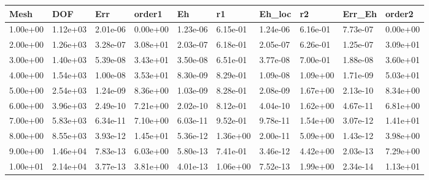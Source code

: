 \begin{tabular}{llllllllll}
Mesh & DOF & Err & order1 & Eh & r1 & Eh_loc & r2 & Err_Eh & order2 \\ 
\hline 
1.00e+00 & 1.12e+03 & 2.01e-06 & 0.00e+00 & 1.23e-06 & 6.15e-01 & 1.24e-06 & 6.16e-01 & 7.73e-07 & 0.00e+00 \\ 
2.00e+00 & 1.26e+03 & 3.28e-07 & 3.08e+01 & 2.03e-07 & 6.18e-01 & 2.05e-07 & 6.26e-01 & 1.25e-07 & 3.09e+01 \\ 
3.00e+00 & 1.40e+03 & 5.39e-08 & 3.43e+01 & 3.50e-08 & 6.51e-01 & 3.77e-08 & 7.00e-01 & 1.88e-08 & 3.60e+01 \\ 
4.00e+00 & 1.54e+03 & 1.00e-08 & 3.53e+01 & 8.30e-09 & 8.29e-01 & 1.09e-08 & 1.09e+00 & 1.71e-09 & 5.03e+01 \\ 
5.00e+00 & 2.54e+03 & 1.24e-09 & 8.36e+00 & 1.03e-09 & 8.28e-01 & 2.08e-09 & 1.67e+00 & 2.13e-10 & 8.34e+00 \\ 
6.00e+00 & 3.96e+03 & 2.49e-10 & 7.21e+00 & 2.02e-10 & 8.12e-01 & 4.04e-10 & 1.62e+00 & 4.67e-11 & 6.81e+00 \\ 
7.00e+00 & 5.83e+03 & 6.34e-11 & 7.10e+00 & 6.03e-11 & 9.52e-01 & 9.78e-11 & 1.54e+00 & 3.07e-12 & 1.41e+01 \\ 
8.00e+00 & 8.55e+03 & 3.93e-12 & 1.45e+01 & 5.36e-12 & 1.36e+00 & 2.00e-11 & 5.09e+00 & 1.43e-12 & 3.98e+00 \\ 
9.00e+00 & 1.46e+04 & 7.83e-13 & 6.03e+00 & 5.80e-13 & 7.41e-01 & 3.46e-12 & 4.42e+00 & 2.03e-13 & 7.29e+00 \\ 
1.00e+01 & 2.14e+04 & 3.77e-13 & 3.81e+00 & 4.01e-13 & 1.06e+00 & 7.52e-13 & 1.99e+00 & 2.34e-14 & 1.13e+01 \\ 
\hline 
\end{tabular}